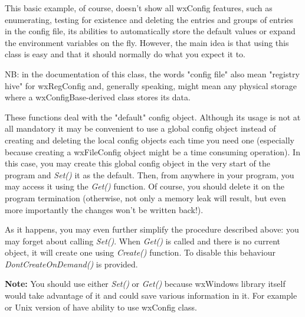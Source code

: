 This basic example, of course, doesn't show all wxConfig features, such as
enumerating, testing for existence and deleting the entries and groups of
entries in the config file, its abilities to automatically store the default
values or expand the environment variables on the fly. However, the main idea
is that using this class is easy and that it should normally do what you
expect it to.

NB: in the documentation of this class, the words "config file" also mean
"registry hive" for wxRegConfig and, generally speaking, might mean any
physical storage where a wxConfigBase-derived class stores its data.


\label{wxconfigstaticfunctions}

These functions deal with the "default" config object. Although its usage is
not at all mandatory it may be convenient to use a global config object
instead of creating and deleting the local config objects each time you need
one (especially because creating a wxFileConfig object might be a time
consuming operation). In this case, you may create this global config object
in the very start of the program and {\it Set()} it as the default. Then, from
anywhere in your program, you may access it using the {\it Get()} function. Of
course, you should delete it on the program termination (otherwise, not only a
memory leak will result, but even more importantly the changes won't be
written back!).

As it happens, you may even further simplify the procedure described above:
you may forget about calling {\it Set()}. When {\it Get()} is called and there
is no current object, it will create one using {\it Create()} function. To
disable this behaviour {\it DontCreateOnDemand()} is provided.

{\bf Note:} You should use either {\it Set()} or {\it Get()} because wxWindows
library itself would take advantage of it and could save various information
in it. For example  or Unix version
of  have ability to use wxConfig class.

\\
\\
\\

